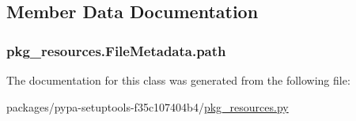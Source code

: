 \subsection{Member Data Documentation}
\hypertarget{classpkg__resources_1_1FileMetadata_a2855060a8b7e183c33be0b709c9288c7}{}
\subsubsection[{path}]{\setlength{\rightskip}{0pt plus 5cm}pkg\+\_\+resources.\+File\+Metadata.\+path}\label{classpkg__resources_1_1FileMetadata_a2855060a8b7e183c33be0b709c9288c7}


The documentation for this class was generated from the following file\+:\begin{DoxyCompactItemize}
\item 
packages/pypa-\/setuptools-\/f35c107404b4/\hyperlink{pkg__resources_8py}{pkg\+\_\+resources.\+py}\end{DoxyCompactItemize}
